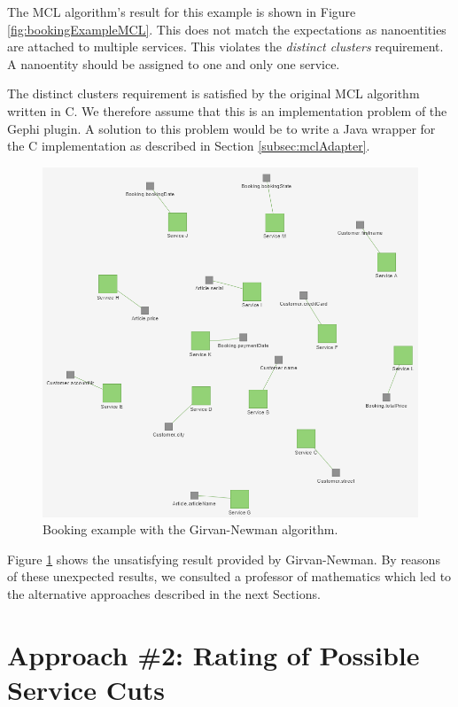 The MCL algorithm's result for this example is shown in Figure \ref{fig:bookingExampleMCL}. This does not match the expectations as nanoentities are attached to multiple services. This violates the \textit{distinct clusters} requirement. A nanoentity should be assigned to one and only one service. 

The distinct clusters requirement is satisfied by the original MCL algorithm written in C. We therefore assume that this is  an implementation problem of the Gephi plugin\cite{gephiMarkov}. A solution to this problem would be to write a Java wrapper for the C implementation as described in Section \ref{subsec:mclAdapter}.

\begin{figure}[H]
	\begin{center}
		\includegraphics[scale=0.65]{images/girvan_entities_fail.png}
	\end{center}
	\caption{Booking example with the Girvan-Newman algorithm.}
	\label{fig:bookingExampleGirvan}
\end{figure}

Figure \ref{fig:bookingExampleGirvan} shows the unsatisfying result provided by Girvan-Newman. By reasons of these unexpected results, we consulted a professor of mathematics which led to the alternative approaches described in the next Sections.
\clearpage
\section{Approach \#2: Rating of Possible Service Cuts}

